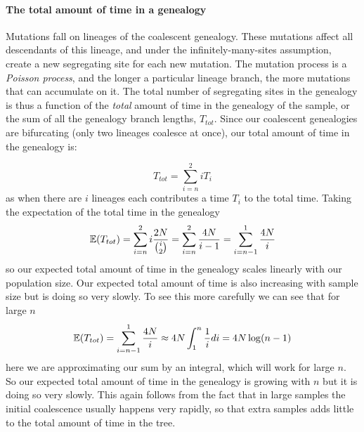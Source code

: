 
\paragraph{The total amount of time in a genealogy}

Mutations fall on lineages of the coalescent genealogy. These mutations affect all
descendants of this lineage, and under the infinitely-many-sites assumption,
create a new segregating site for each new mutation. The mutation process is a
\emph{Poisson process}, and the longer a particular lineage branch, the more
mutations that can accumulate on it. The total number of segregating sites in
the genealogy is thus a function of the \emph{total} amount of time in the
genealogy of the sample, or the sum of all the genealogy branch lengths,
$T_{tot}$. Since our coalescent genealogies are bifurcating (only two lineages
coalesce at once), our total amount of time in the genealogy is:

\begin{equation}
T_{tot} = \sum_{i=n}^2 iT_i
\end{equation}
as when there are $i$ lineages each contributes a time $T_i$ to the
total time. Taking the expectation of the total time in the genealogy
\begin{equation}
\mathbb{E}(T_{tot}) = \sum_{i=n}^2 i \frac{2N}{{i \choose
 2} } = \sum_{i=n}^2 \frac{4N}{i -1} =\sum_{i=n-1}^1 \frac{4N}{i}
\end{equation}
so our expected total amount of time in the genealogy scales linearly
with our population size. Our expected total amount of time is also
increasing with sample size but is doing so very slowly. To see this
more carefully we can see that for large $n$
\begin{equation}
\mathbb{E}(T_{tot}) = \sum_{i=n-1}^1 \frac{4N}{i} \approx 4N \int_1^n \frac{1}{i} di
= 4N \log(n-1)
\end{equation}
here we are approximating our sum by an integral, which will work for
large $n$. So our expected total amount of time in the genealogy
is growing with $n$ but it is doing so very slowly. This again follows
from the fact that in large samples the initial coalescence usually
happens very rapidly, so that extra samples adds little to the total
amount of time in the tree. \\

